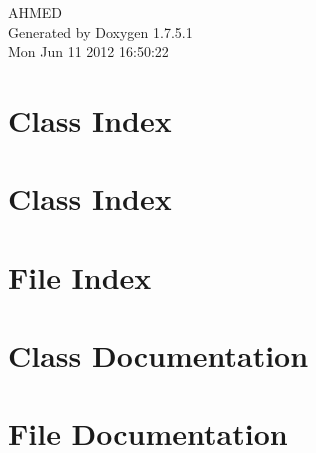 \documentclass[a4paper]{book}
\begin{document}
\hypersetup{pageanchor=false,citecolor=blue}
\begin{titlepage}
\vspace*{7cm}
\begin{center}
{\Large \-A\-H\-M\-E\-D }\\
\vspace*{1cm}
{\large \-Generated by Doxygen 1.7.5.1}\\
\vspace*{0.5cm}
{\small Mon Jun 11 2012 16:50:22}\\
\end{center}
\end{titlepage}
\clearemptydoublepage
{}
\tableofcontents
\clearemptydoublepage
{}
\hypersetup{pageanchor=true,citecolor=blue}
\chapter{\-Class \-Index}

\chapter{\-Class \-Index}

\chapter{\-File \-Index}

\chapter{\-Class \-Documentation}













\chapter{\-File \-Documentation}





\printindex
\end{document}
